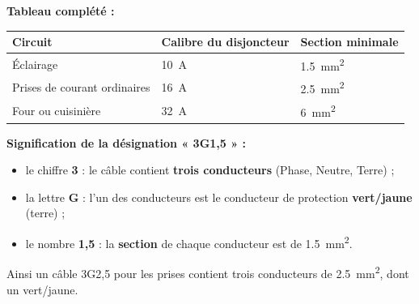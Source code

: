 \documentclass[11pt]{article}
\begin{document}
\begin{corrige}
\textbf{Tableau complété :}
\begin{center}
\begin{tabularx}{\linewidth}{|X|l|l|}
\hline
\rowcolor{popblueL} \textbf{Circuit} & \textbf{Calibre du disjoncteur} & \textbf{Section minimale} \\
\hline
Éclairage & \SI{10}{A} & \SI{1,5}{mm^2} \\
\hline
Prises de courant ordinaires & \SI{16}{A} & \SI{2,5}{mm^2} \\
\hline
Four ou cuisinière & \SI{32}{A} & \SI{6}{mm^2} \\
\hline
\end{tabularx}
\end{center}

\textbf{Signification de la désignation « 3G1,5 » :}
\begin{itemize}
\item le chiffre \textbf{3} : le câble contient \textbf{trois conducteurs} (Phase, Neutre, Terre) ;
\item la lettre \textbf{G} : l'un des conducteurs est le conducteur de protection \textbf{vert/jaune} (terre) ;
\item le nombre \textbf{1,5} : la \textbf{section} de chaque conducteur est de \SI{1,5}{mm^2}.
\end{itemize}
Ainsi un câble 3G2,5 pour les prises contient trois conducteurs de \SI{2,5}{mm^2}, dont un vert/jaune.
\end{corrige}
\end{document}
